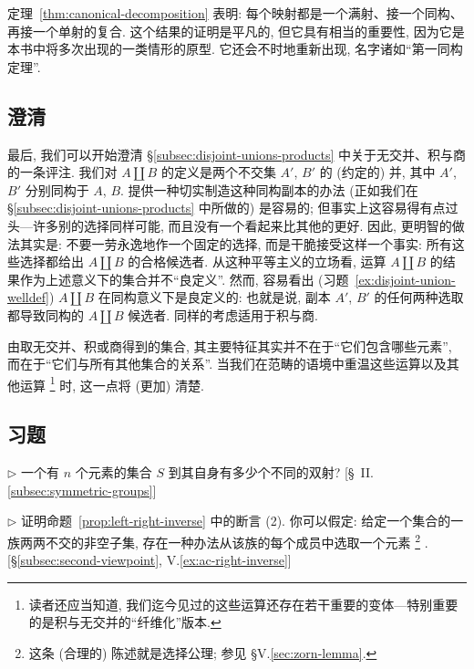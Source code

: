 定理~\ref{thm:canonical-decomposition} 表明: 每个映射都是一个满射、接一个同构、再接一个单射的复合. 这个结果的证明是平凡的, 但它具有相当的重要性, 因为它是本书中将多次出现的一类情形的原型. 它还会不时地重新出现, 名字诸如``第一同构定理''.

\subsection{澄清}
\label{subsec:clarification}

最后, 我们可以开始澄清 \S\ref{subsec:disjoint-unions-products} 中关于无交并、积与商的一条评注. 我们对 $A \amalg B$ 的定义是两个不交集 $A'$, $B'$ 的 (约定的) 并, 其中 $A'$, $B'$ 分别同构于 $A$, $B$. 提供一种切实制造这种同构副本的办法 (正如我们在 \S\ref{subsec:disjoint-unions-products} 中所做的) 是容易的; 但事实上这容易得有点过头---许多别的选择同样可能, 而且没有一个看起来比其他的更好. 因此, 更明智的做法其实是: 不要一劳永逸地作一个固定的选择, 而是干脆接受这样一个事实: 所有这些选择都给出 $A \amalg B$ 的合格候选者. 从这种平等主义的立场看, 运算 $A \amalg B$ 的结果作为上述意义下的集合并不``良定义''. 然而, 容易看出 (习题~\ref{ex:disjoint-union-welldef}) $A \amalg B$ 在同构意义下是良定义的: 也就是说, 副本 $A'$, $B'$ 的任何两种选取都导致同构的 $A \amalg B$ 候选者. 同样的考虑适用于积与商.

由取无交并、积或商得到的集合, 其主要特征其实并不在于``它们包含哪些元素'', 而在于``它们与所有其他集合的关系''. 当我们在范畴的语境中重温这些运算以及其他运算%
\footnote{读者还应当知道, 我们迄今见过的这些运算还存在若干重要的变体---特别重要的是积与无交并的``纤维化''版本.}%
时, 这一点将 (更加) 清楚.

\subsection*{习题}
{}

\begin{prob}
\label{ex:bijections-count}
$\triangleright$ 一个有 $n$ 个元素的集合 $S$ 到其自身有多少个不同的双射? [\S~II.\ref{subsec:symmetric-groups}]
\end{prob}

\begin{prob}
\label{ex:right-inverse}
$\triangleright$ 证明命题~\ref{prop:left-right-inverse} 中的断言 (2). 你可以假定: 给定一个集合的一族两两不交的非空子集, 存在一种办法从该族的每个成员中选取一个元素%
\footnote{这条 (合理的) 陈述就是选择公理; 参见 \S V.\ref{sec:zorn-lemma}.}%
. [\S\ref{subsec:second-viewpoint}, V.\ref{ex:ac-right-inverse}]
\end{prob}

